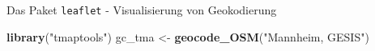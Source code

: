 \documentclass[ignorenonframetext,]{beamer}
\newenvironment{Shaded}{\begin{snugshade}}{\end{snugshade}}
\newcommand{\KeywordTok}[1]{\textcolor[rgb]{0.26,0.66,0.93}{\textbf{#1}}}
\newcommand{\DataTypeTok}[1]{\textcolor[rgb]{0.74,0.68,0.62}{\underline{#1}}}
\newcommand{\FloatTok}[1]{\textcolor[rgb]{0.27,0.67,0.26}{#1}}
\newcommand{\StringTok}[1]{\textcolor[rgb]{0.02,0.61,0.04}{#1}}
\newcommand{\OperatorTok}[1]{\textcolor[rgb]{0.74,0.68,0.62}{#1}}
\newcommand{\NormalTok}[1]{\textcolor[rgb]{0.74,0.68,0.62}{#1}}
\begin{document}
\begin{frame}[fragile]{Das Paket \texttt{leaflet} - Visualisierung von
Geokodierung}

\begin{Shaded}
\begin{Highlighting}[]
\KeywordTok{library}\NormalTok{(}\StringTok{"tmaptools"}\NormalTok{)}
\NormalTok{gc_tma <-}\StringTok{ }\KeywordTok{geocode_OSM}\NormalTok{(}\StringTok{"Mannheim, GESIS"}\NormalTok{)}
\end{Highlighting}
\end{Shaded}

\begin{Shaded}
\end{Shaded}

\end{frame}
\end{document}
